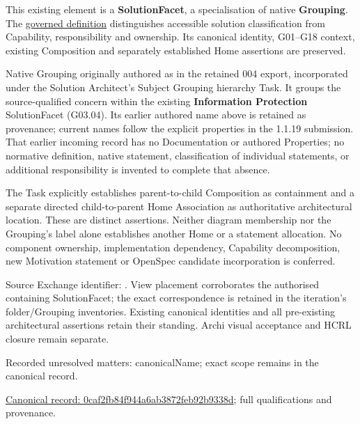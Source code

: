 This existing element is a \textbf{SolutionFacet}, a specialisation of native
\textbf{Grouping}. The \href{\detokenize{../../../../../../../governance/continuum-representation.md#solutionfacet-classification--1119-candidate}}{governed definition}
distinguishes accessible solution classification from Capability, responsibility
and ownership. Its canonical identity, G01–G18 context, existing Composition
and separately established Home assertions are preserved.



Native Grouping originally authored as \texttt{} in the retained 004 export,
incorporated under the Solution Architect's Subject Grouping hierarchy Task.
It groups the source-qualified \texttt{} concern within
the existing \textbf{Information Protection} SolutionFacet (G03.04). Its earlier authored name above is retained as provenance; current names
follow the explicit properties in the 1.1.19 submission.
That earlier incoming record has no Documentation or authored Properties; no normative
definition, native statement, classification of individual statements, or
additional responsibility is invented to complete that absence.



The Task explicitly establishes parent-to-child Composition as containment and
a separate directed child-to-parent Home Association as authoritative architectural
location. These are distinct assertions. Neither diagram membership nor the
Grouping's label alone establishes another Home or a statement allocation.
No component ownership, implementation dependency, Capability decomposition,
new Motivation statement or OpenSpec candidate incorporation is conferred.



Source Exchange identifier: \texttt{}. View placement corroborates
the authorised containing SolutionFacet; the exact correspondence is retained in the
iteration's folder/Grouping inventories. Existing canonical identities and all
pre-existing architectural assertions retain their standing. Archi visual
acceptance and HCRL closure remain separate.


{\small Recorded unresolved matters: canonicalName; exact scope remains in the canonical record.}\par
{\footnotesize \href{../../../../../../../continuum/grouping/0caf2fb84f944a6ab3872feb92b9338d.md}{Canonical record: 0caf2fb84f944a6ab3872feb92b9338d}; full qualifications and provenance.}\par
